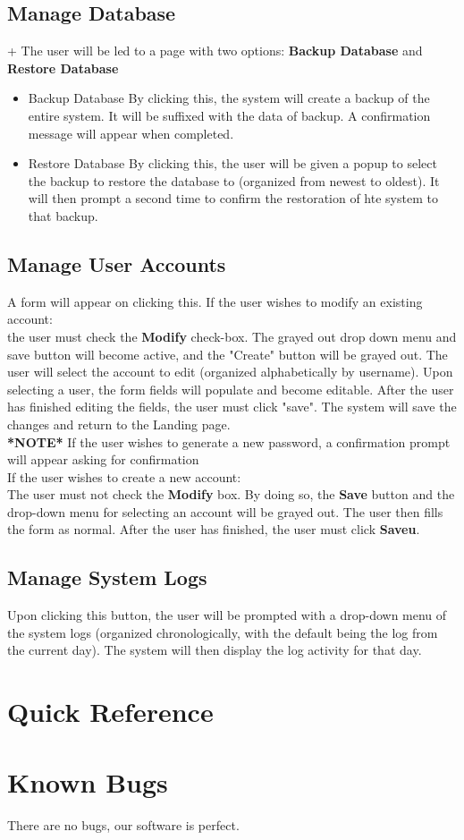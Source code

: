 \documentclass{article}
\begin{document}
\subsection{Manage Database}
+%
The user will be led to a page with two options: \textbf{Backup Database} and
\textbf{Restore Database}
\begin{itemize}
  \item Backup Database
    By clicking this, the system will create a backup of the entire system.
    It will be suffixed with the data of backup. A confirmation message will
    appear when completed.
  \item Restore Database
By clicking this, the user will be given a popup to select the backup to restore the database to (organized from newest to oldest). It will then prompt a second time to confirm the restoration of hte system to that backup.

\end{itemize}
\subsection{Manage User Accounts}
A form will appear on clicking this. 
If the user wishes to modify an existing account: \\
the user must check the \textbf{Modify} check-box. The grayed out drop down menu and
save button will become active, and the "Create" button will be grayed out.
The user will select the account to edit (organized alphabetically by username).
Upon selecting a user, the form fields will populate and become editable. After
the user has finished editing the fields, the user must click "save". The system
will save the changes and return to the Landing page. \\
\textbf{*NOTE*} If the user wishes to generate a new password, a confirmation
prompt will appear asking for confirmation \\
If the user wishes to create a new account: \\
The user must not check the \textbf{Modify} box. By doing so, the \textbf{Save} button and
the drop-down menu for selecting an account will be grayed out. The user then
fills the form as normal. After the user has finished, the user must click \textbf{Saveu}.
\subsection{Manage System Logs}
Upon clicking this button, the user will be prompted with a drop-down menu of
the system logs (organized chronologically, with the default being the log
from the current day). The system will then display the log activity for
that day.

\section{Quick Reference}  %

\section{Known Bugs}
There are no bugs, our software is perfect.
\end{document}
